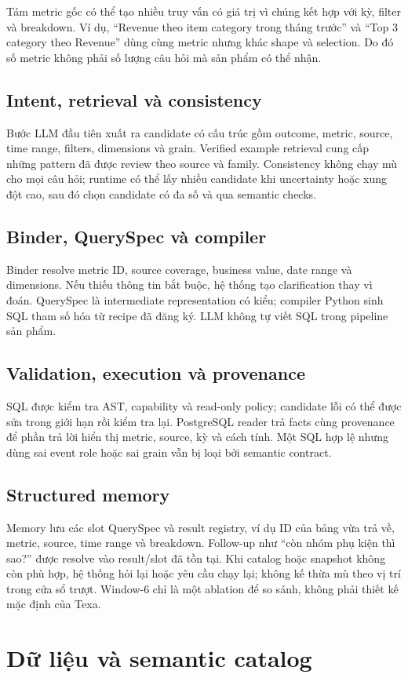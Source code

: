 \documentclass[11pt,a4paper]{article}
\begin{document}
Tám metric gốc có thể tạo nhiều truy vấn có giá trị vì chúng kết hợp với kỳ, filter và breakdown. Ví dụ, ``Revenue theo item category trong tháng trước'' và ``Top 3 category theo Revenue'' dùng cùng metric nhưng khác shape và selection. Do đó số metric không phải số lượng câu hỏi mà sản phẩm có thể nhận.
\subsection{Intent, retrieval và consistency}
Bước LLM đầu tiên xuất ra candidate có cấu trúc gồm outcome, metric, source, time range, filters, dimensions và grain. Verified example retrieval cung cấp những pattern đã được review theo source và family. Consistency không chạy mù cho mọi câu hỏi; runtime có thể lấy nhiều candidate khi uncertainty hoặc xung đột cao, sau đó chọn candidate có đa số và qua semantic checks.
\subsection{Binder, QuerySpec và compiler}
Binder resolve metric ID, source coverage, business value, date range và dimensions. Nếu thiếu thông tin bắt buộc, hệ thống tạo clarification thay vì đoán. QuerySpec là intermediate representation có kiểu; compiler Python sinh SQL tham số hóa từ recipe đã đăng ký. LLM không tự viết SQL trong pipeline sản phẩm.
\subsection{Validation, execution và provenance}
SQL được kiểm tra AST, capability và read-only policy; candidate lỗi có thể được sửa trong giới hạn rồi kiểm tra lại. PostgreSQL reader trả facts cùng provenance để phần trả lời hiển thị metric, source, kỳ và cách tính. Một SQL hợp lệ nhưng dùng sai event role hoặc sai grain vẫn bị loại bởi semantic contract.
\subsection{Structured memory}
Memory lưu các slot QuerySpec và result registry, ví dụ ID của bảng vừa trả về, metric, source, time range và breakdown. Follow-up như ``còn nhóm phụ kiện thì sao?'' được resolve vào result/slot đã tồn tại. Khi catalog hoặc snapshot không còn phù hợp, hệ thống hỏi lại hoặc yêu cầu chạy lại; không kế thừa mù theo vị trí trong cửa sổ trượt. Window-6 chỉ là một ablation để so sánh, không phải thiết kế mặc định của Texa.

\section{Dữ liệu và semantic catalog}
\end{document}
